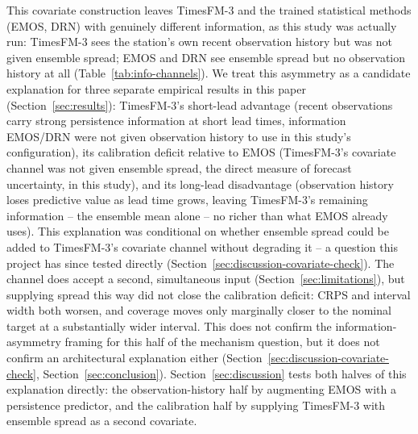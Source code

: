 This covariate construction leaves TimesFM-3 and the trained statistical
methods (EMOS, DRN) with genuinely different information, as this study
was actually run: TimesFM-3 sees the station's own recent observation
history but was not given ensemble spread; EMOS and DRN see ensemble
spread but no observation history at all (Table~\ref{tab:info-channels}).
We treat this asymmetry as a candidate explanation for three separate
empirical results in this paper (Section~\ref{sec:results}): TimesFM-3's
short-lead advantage (recent observations carry strong persistence
information at short lead times, information EMOS/DRN were not given
observation history to use in this study's configuration),
its calibration deficit relative to EMOS (TimesFM-3's covariate channel
was not given ensemble spread, the direct measure of forecast
uncertainty, in this study), and its long-lead disadvantage (observation
history loses predictive value as lead time grows, leaving TimesFM-3's
remaining information -- the ensemble mean alone -- no richer than what
EMOS already uses). This explanation was conditional on whether ensemble spread could be
added to TimesFM-3's covariate channel without degrading it -- a
question this project has since tested directly
(Section~\ref{sec:discussion-covariate-check}). The channel does accept
a second, simultaneous input (Section~\ref{sec:limitations}), but
supplying spread this way did not close the calibration deficit: CRPS
and interval width both worsen, and coverage moves only marginally
closer to the nominal target at a substantially wider interval. This
does not confirm the information-asymmetry framing for this half of the
mechanism question, but it does not confirm an architectural explanation
either (Section~\ref{sec:discussion-covariate-check},
Section~\ref{sec:conclusion}).
Section~\ref{sec:discussion} tests both halves of this explanation
directly: the observation-history half by augmenting EMOS with a
persistence predictor, and the calibration half by supplying TimesFM-3
with ensemble spread as a second covariate.

